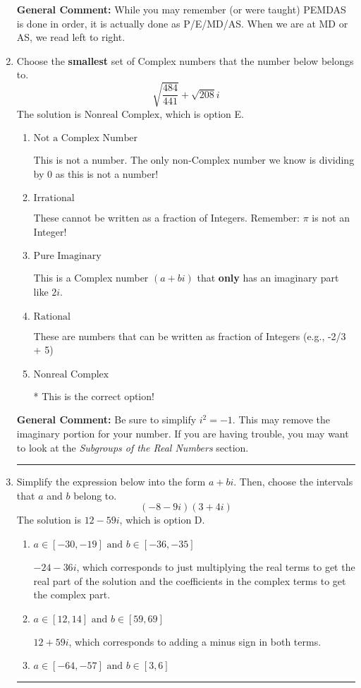 \documentclass{extbook}[14pt]
\newcommand{\litem}[1]{\item #1

\rule{\textwidth}{0.4pt}}
\begin{document}
\begin{enumerate}
{\textbf{General Comment:} While you may remember (or were taught) PEMDAS is done in order, it is actually done as P/E/MD/AS. When we are at MD or AS, we read left to right.
}
\litem{
Choose the \textbf{smallest} set of Complex numbers that the number below belongs to.
\[ \sqrt{\frac{484}{441}}+\sqrt{208} i \]
The solution is \( \text{Nonreal Complex} \), which is option E.\begin{enumerate}[label=\Alph*.]
\item \( \text{Not a Complex Number} \)

This is not a number. The only non-Complex number we know is dividing by 0 as this is not a number!
\item \( \text{Irrational} \)

These cannot be written as a fraction of Integers. Remember: $\pi$ is not an Integer!
\item \( \text{Pure Imaginary} \)

This is a Complex number $(a+bi)$ that \textbf{only} has an imaginary part like $2i$.
\item \( \text{Rational} \)

These are numbers that can be written as fraction of Integers (e.g., -2/3 + 5)
\item \( \text{Nonreal Complex} \)

* This is the correct option!
\end{enumerate}

\textbf{General Comment:} Be sure to simplify $i^2 = -1$. This may remove the imaginary portion for your number. If you are having trouble, you may want to look at the \textit{Subgroups of the Real Numbers} section.
}
\litem{
Simplify the expression below into the form $a+bi$. Then, choose the intervals that $a$ and $b$ belong to.
\[ (-8 - 9 i)(3 + 4 i) \]
The solution is \( 12 - 59 i \), which is option D.\begin{enumerate}[label=\Alph*.]
\item \( a \in [-30, -19] \text{ and } b \in [-36, -35] \)

 $-24 - 36 i$, which corresponds to just multiplying the real terms to get the real part of the solution and the coefficients in the complex terms to get the complex part.
\item \( a \in [12, 14] \text{ and } b \in [59, 69] \)

 $12 + 59 i$, which corresponds to adding a minus sign in both terms.
\item \( a \in [-64, -57] \text{ and } b \in [3, 6] \)


\end{enumerate}}
\end{enumerate}
\end{document}
